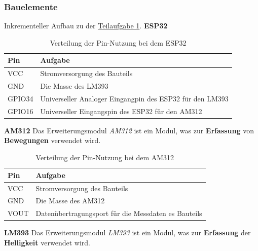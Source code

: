 \documentclass[18pt]{article}
\begin{document}
\subsubsection{Bauelemente}
Inkrementeller Aufbau zu der \hyperref[tab:teil_1_steckbrett_esp32]{Teilaufgabe 1}.
\newline
\newline
\textbf{ESP32}
\renewcommand{\arraystretch}{1.5}
\begin{table}[h!]
	\centering
	\caption{Verteilung der Pin-Nutzung bei dem ESP32}
	\label{tab:teil_2_steckbrett_esp32}
	\begin{tabular}{|l|l|} 
		\hline
		Pin & Aufgabe \\
		\hline
		VCC & Stromversorgung des Bauteils \\
		GND & Die Masse des LM393 \\
		GPIO34 & Universeller Analoger Eingangpin des ESP32 für den LM393 \\
		GPIO16 & Universeller Eingangspin des ESP32 für den AM312 \\
		\hline
	\end{tabular}
\end{table}
\renewcommand{\arraystretch}{1}
\newline
\newline
\textbf{AM312}
\newline
Das Erweiterungsmodul \textit{AM312} ist ein Modul, was zur \textbf{Erfassung} von \textbf{Bewegungen} verwendet wird.
\renewcommand{\arraystretch}{1.5}
\begin{table}[h!]
	\centering
	\caption{Verteilung der Pin-Nutzung bei dem AM312}
	\label{tab:teil_2_steckbrett_am312}
	\begin{tabular}{|l|l|}
		\hline
		Pin & Aufgabe \\
		\hline
		VCC & Stromversorgung des Bauteils \\
		GND & Die Masse des AM312 \\
		VOUT & Datenübertragungsport für die Messdaten es Bauteils \\
		\hline
	\end{tabular}
\end{table}
\renewcommand{\arraystretch}{1}
\newline
\newline
\textbf{LM393}
\newline
Das Erweiterungsmodul \textit{LM393} ist ein Modul, was zur \textbf{Erfassung} der \textbf{Helligkeit} verwendet wird.
\renewcommand{\arraystretch}{1.5}
\end{document}
